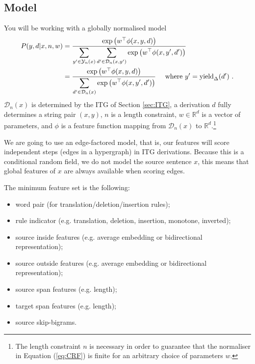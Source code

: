 \subsection{Model}

You will be working with a globally normalised model
\begin{equation}
\begin{aligned}\label{eq:CRF}
	P( y,  d| x, n, w) &=  \frac{\exp \left( w^\top \phi( x,  y,  d) \right)}{\displaystyle\sum_{y' \in \mathcal Y_n(x)} \displaystyle\sum_{ d' \in \mathcal D_n(x, y')} \exp \left( w^\top \phi( x,  y',  d') \right)} \\
	 &= \frac{\exp \left( w^\top \phi( x,  y,  d) \right)}{\displaystyle\sum_{ d' \in \mathcal D_n(x)} \exp \left( w^\top \phi( x,  y',  d') \right)} ~~~ \text{ where } y' = \operatorname{yield}_\Delta(d') ~ .
\end{aligned}
\end{equation}
$\mathcal D_n( x)$ is determined by the ITG of Section \ref{sec:ITG}, a derivation $d$ fully determines a string pair $( x,  y)$, $n$ is a length constraint, $w \in \mathbb R^d$ is a vector of parameters, and $\phi$ is a feature function mapping from $\mathcal D_n( x)$ to $\mathbb R^d$.\footnote{The length constraint $n$ is necessary in order to guarantee that the normaliser in Equation (\ref{eq:CRF}) is finite for an arbitrary choice of parameters $w$.}

We are going to use an edge-factored model, that is, our features will score independent steps (edges in a hypergraph) in ITG derivations. 
Because this is a conditional random field, we do not model the source sentence $x$, this means that global features of $x$ are always available when scoring edges.

The minimum feature set is the following:
\begin{itemize}
	\item word pair (for translation/deletion/insertion rules);
	\item rule indicator (e.g. translation, deletion, insertion, monotone, inverted);
	\item source inside features (e.g. average embedding or bidirectional representation);
	\item source outside features (e.g. average embedding or bidirectional representation);
	\item source span features (e.g. length); 
	\item target span features (e.g. length);
	\item source skip-bigrams.
\end{itemize}


